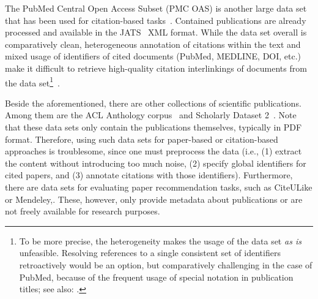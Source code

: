 The PubMed Central Open Access Subset (PMC OAS) is another large data set that has been used for citation-based tasks~\cite{Gipp2015,Duma2016,Galke2018}. Contained publications are already processed and available in the JATS~\cite{Huh2014} XML format. While the data set overall is comparatively clean, heterogeneous annotation of citations within the text and mixed usage of identifiers of cited documents (PubMed, MEDLINE, DOI, etc.) make it difficult to retrieve high-quality citation interlinkings of documents from the data set\footnote{To be more precise, the heterogeneity makes the usage of the data set \emph{as is} unfeasible. Resolving references to a single consistent set of identifiers retroactively would be an option, but comparatively challenging in the case of PubMed, because of the frequent usage of special notation in publication titles; see also: .}~\cite{Gipp2015}.

Beside the aforementioned, there are other collections of scientific publications. Among them are the ACL Anthology corpus~\cite{Bird2008ACLARC} and Scholarly Dataset 2~\cite{Sugiyama2015}.
Note that these data sets only contain the publications themselves, typically in PDF format. Therefore, using such data sets for paper-based or citation-based approaches is troublesome, since one must preprocess the data (i.e., (1) extract the content without introducing too much noise, (2) specify global identifiers for cited papers, and (3) annotate citations with those identifiers).
Furthermore, there are data sets for evaluating paper recommendation tasks, such as CiteULike or Mendeley,. These, however, only provide metadata about publications or are not freely available for research purposes.

